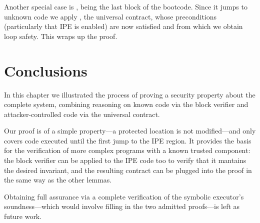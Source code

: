 Another special case is , being the last block of the bootcode. Since it jumps to unknown code we apply , \ie the universal contract, whose preconditions (particularly that IPE is enabled) are now satisfied and from which we obtain loop safety. This wraps up the proof.

\section{Conclusions}

In this chapter we illustrated the process of proving a security property about the complete system, combining reasoning on known code via the block verifier and attacker-controlled code via the universal contract.

Our proof is of a simple property---a protected location is not modified---and only covers code executed until the first jump to the IPE region. It provides the basis for the verification of more complex programs with a known trusted component: the block verifier can be applied to the IPE code too to verify that it mantains the desired invariant, and the resulting contract can be plugged into the proof in the same way as the other  lemmas.

Obtaining full assurance via a complete verification of the symbolic executor's soundness---which would involve filling in the two admitted proofs---is left as future work.
